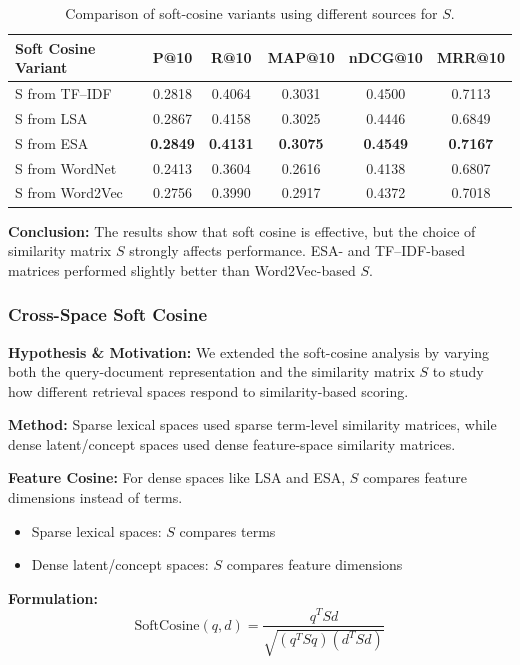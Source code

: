 \documentclass[runningheads]{llncs}
\begin{document}
\begin{table}[h]
\centering
\begin{tabular}{lccccc}
\toprule
\textbf{Soft Cosine Variant} & \textbf{P@10} & \textbf{R@10} & \textbf{MAP@10} & \textbf{nDCG@10} & \textbf{MRR@10} \\
\midrule
S from TF--IDF & 0.2818 & 0.4064 & 0.3031 & 0.4500 & 0.7113 \\
S from LSA & 0.2867 & 0.4158 & 0.3025 & 0.4446 & 0.6849 \\
S from ESA & \textbf{0.2849} & \textbf{0.4131} & \textbf{0.3075} & \textbf{0.4549} & \textbf{0.7167} \\
S from WordNet & 0.2413 & 0.3604 & 0.2616 & 0.4138 & 0.6807 \\
S from Word2Vec & 0.2756 & 0.3990 & 0.2917 & 0.4372 & 0.7018 \\
\bottomrule
\end{tabular}
\caption{Comparison of soft-cosine variants using different sources for $S$.}
\label{tab:soft_cosine_sources}
\end{table}

\textbf{Conclusion:}  
The results show that soft cosine is effective, but the choice of similarity matrix $S$ strongly affects performance. ESA- and TF--IDF-based matrices performed slightly better than Word2Vec-based $S$.

\subsubsection{Cross-Space Soft Cosine}

\textbf{Hypothesis \& Motivation:}  
We extended the soft-cosine analysis by varying both the query-document representation and the similarity matrix $S$ to study how different retrieval spaces respond to similarity-based scoring.

\textbf{Method:}  
Sparse lexical spaces used sparse term-level similarity matrices, while dense latent/concept spaces used dense feature-space similarity matrices.

\textbf{Feature Cosine:}  
For dense spaces like LSA and ESA, $S$ compares feature dimensions instead of terms.
\begin{itemize}[noitemsep]
    \item Sparse lexical spaces: $S$ compares terms
    \item Dense latent/concept spaces: $S$ compares feature dimensions
\end{itemize}

\textbf{Formulation:}
\begin{equation}
\text{SoftCosine}(q,d)=\frac{q^{T}Sd}{\sqrt{(q^{T}Sq)(d^{T}Sd)}}
\end{equation}
\end{document}
